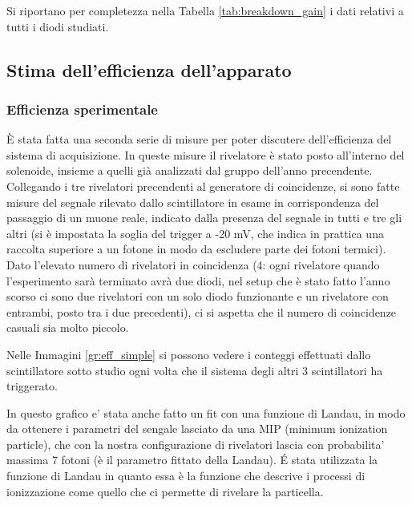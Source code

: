 Si riportano per completezza nella Tabella \ref{tab:breakdown_gain} i dati relativi a tutti i diodi studiati.


\subsection{Stima dell'efficienza dell'apparato}
\subsubsection{Efficienza sperimentale}
\`E stata fatta una seconda serie di misure per poter discutere dell'efficienza del sistema di acquisizione. In queste misure il rivelatore \`e stato posto all'interno del solenoide, insieme a quelli gi\`a analizzati dal gruppo dell'anno precendente. Collegando i tre rivelatori precendenti al generatore di coincidenze, si sono fatte misure del segnale rilevato dallo scintillatore in esame in corrispondenza del passaggio di un muone reale, indicato dalla presenza del segnale in tutti e tre gli altri (si è impostata la soglia del trigger a -20 mV, che indica in prattica una raccolta superiore a un fotone in modo da escludere parte dei fotoni termici). Dato l'elevato numero di rivelatori in coincidenza (4: ogni rivelatore quando l'esperimento sarà terminato avrà due diodi, nel setup che è stato fatto l'anno scorso ci sono due rivelatori con un solo diodo funzionante e un rivelatore con entrambi, posto tra i due precedenti), ci si aspetta che il numero di coincidenze casuali sia molto piccolo.

Nelle Immagini \ref{gr:eff_simple} si possono vedere i conteggi effettuati dallo scintillatore sotto studio ogni volta che il sistema degli altri 3 scintillatori ha triggerato.


In questo grafico e' stata anche fatto un fit con una funzione di Landau, in modo da ottenere i parametri del sengale lasciato da una MIP (minimum ionization particle), che con la nostra configurazione di rivelatori lascia con probabilita' massima 7 fotoni (è il parametro fittato della Landau). \'E stata utilizzata la funzione di Landau in quanto essa è la funzione che descrive i processi di ionizzazione come quello che ci permette di rivelare la particella.

